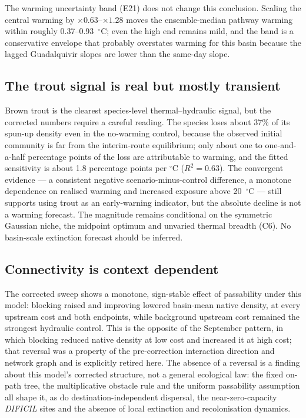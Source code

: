 \documentclass[11pt,a4paper]{article}
\begin{document}
The warming uncertainty band (E21) does not change this conclusion. Scaling the central warming by $\times0.63$--$\times1.28$ moves the ensemble-median pathway warming within roughly 0.37--0.93~$^\circ$C; even the high end remains mild, and the band is a conservative envelope that probably overstates warming for this basin because the lagged Guadalquivir slopes are lower than the same-day slope.

\subsection{The trout signal is real but mostly transient}

Brown trout is the clearest species-level thermal--hydraulic signal, but the corrected numbers require a careful reading. The species loses about 37\% of its spun-up density even in the no-warming control, because the observed initial community is far from the interim-route equilibrium; only about one to one-and-a-half percentage points of the loss are attributable to warming, and the fitted sensitivity is about 1.8 percentage points per $^\circ$C ($R^2=0.63$). The convergent evidence --- a consistent negative scenario-minus-control difference, a monotone dependence on realised warming and increased exposure above 20~$^\circ$C --- still supports using trout as an early-warning indicator, but the absolute decline is not a warming forecast. The magnitude remains conditional on the symmetric Gaussian niche, the midpoint optimum and unvaried thermal breadth (C6). No basin-scale extinction forecast should be inferred.

\subsection{Connectivity is context dependent}

The corrected sweep shows a monotone, sign-stable effect of passability under this model: blocking raised and improving lowered basin-mean native density, at every upstream cost and both endpoints, while background upstream cost remained the strongest hydraulic control. This is the opposite of the September pattern, in which blocking reduced native density at low cost and increased it at high cost; that reversal was a property of the pre-correction interaction direction and network graph and is explicitly retired here. The absence of a reversal is a finding about this model's corrected structure, not a general ecological law: the fixed on-path tree, the multiplicative obstacle rule and the uniform passability assumption all shape it, as do destination-independent dispersal, the near-zero-capacity \textit{DIFICIL} sites and the absence of local extinction and recolonisation dynamics.
\end{document}
